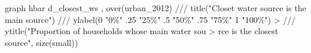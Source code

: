 graph hbar d_closest_ws , over(urban_2012) ///
        title("Closet water source is the main source") ///
        ylabel(0 "0\%" .25 "25\%" .5 "50\%" .75 "75\%" 1 "100\%") 
> ///
        ytitle("Proportion of households whose main water sou
> rce is the closest source", size(small))
